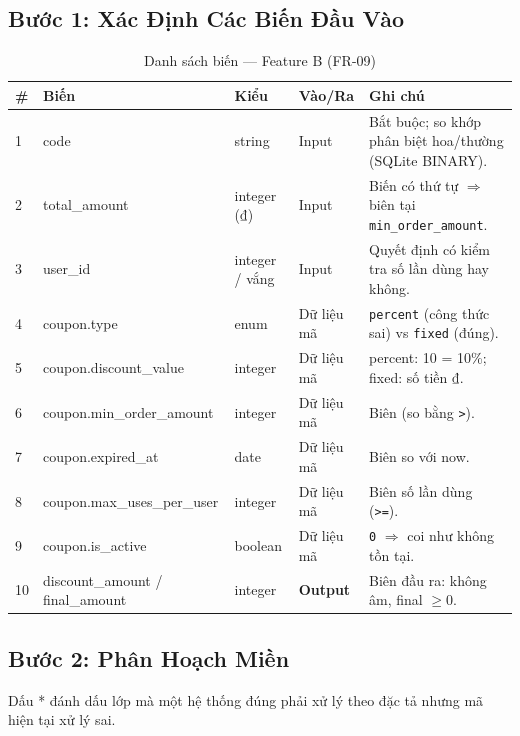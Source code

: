 \documentclass[12pt, a4paper]{report}
\begin{document}
\subsection{Bước 1: Xác Định Các Biến Đầu Vào}
\begin{table}[H]
    \centering
    \caption{Danh sách biến — Feature B (FR-09)}
    \begin{tabularx}{\linewidth}{C{0.5cm} L{3cm} L{2.6cm} C{1.8cm} X}
        \toprule
        \textbf{\#} & \textbf{Biến} & \textbf{Kiểu} & \textbf{Vào/Ra} & \textbf{Ghi chú} \\
         & code & string & Input & Bắt buộc; so khớp phân biệt hoa/thường (SQLite BINARY). \\
        2 & total\_amount & integer (₫) & Input & Biến có thứ tự $\Rightarrow$ biên tại \texttt{min\_order\_amount}. \\
        3 & user\_id & integer / vắng & Input & Quyết định có kiểm tra số lần dùng hay không. \\
        4 & coupon.type & enum & Dữ liệu mã & \texttt{percent} (công thức sai) vs \texttt{fixed} (đúng). \\
        5 & coupon.discount\_value & integer & Dữ liệu mã & percent: 10 = 10\%; fixed: số tiền ₫. \\
        6 & coupon.min\_order\_amount & integer & Dữ liệu mã & Biên (so bằng \texttt{>}). \\
        7 & coupon.expired\_at & date & Dữ liệu mã & Biên so với now. \\
        8 & coupon.max\_uses\_per\_user & integer & Dữ liệu mã & Biên số lần dùng (\texttt{>=}). \\
        9 & coupon.is\_active & boolean & Dữ liệu mã & \texttt{0} $\Rightarrow$ coi như không tồn tại. \\
        10 & discount\_amount / final\_amount & integer & \textbf{Output} & Biên đầu ra: không âm, final $\ge 0$. \\
        \bottomrule
    \end{tabularx}
\end{table}

\subsection{Bước 2: Phân Hoạch Miền}
Dấu * đánh dấu lớp mà một hệ thống đúng phải xử lý theo đặc tả nhưng mã hiện tại
xử lý sai.
\end{document}
